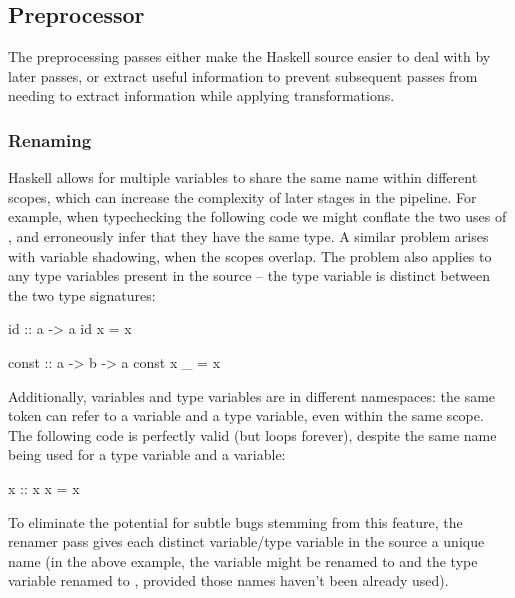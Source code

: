 \documentclass[dissertation.tex]{subfiles}
\begin{document}
{{    }
    \subsection{Preprocessor}
    {

        The preprocessing passes either make the Haskell source easier to deal with by later passes, or extract useful
        information to prevent subsequent passes from needing to extract information while applying transformations.

        \subsubsection{Renaming}
        {

            Haskell allows for multiple variables to share the same name within different scopes, which can increase the
            complexity of later stages in the pipeline. For example, when typechecking the following code we might
            conflate the two uses of , and erroneously infer that they have the same type. A similar problem
            arises with variable shadowing, when the scopes overlap. The problem also applies to any type variables
            present in the source -- the type variable  is distinct between the two type signatures:

            \begin{haskellfigure}
            id :: a -> a
            id x = x

            const :: a -> b -> a
            const x _ = x
            \end{haskellfigure}

            Additionally, variables and type variables are in different namespaces: the same token can refer to a
            variable and a type variable, even within the same scope. The following code is perfectly valid (but loops
            forever), despite the same name being used for a type variable and a variable:

            \begin{haskellfigure}
            x :: x
            x = x
            \end{haskellfigure}

            To eliminate the potential for subtle bugs stemming from this feature, the renamer pass gives each distinct
            variable/type variable in the source a unique name (in the above example, the variable  might be
            renamed to  and the type variable renamed to , provided those names haven't been
            already used).
            
}}}
\end{document}
